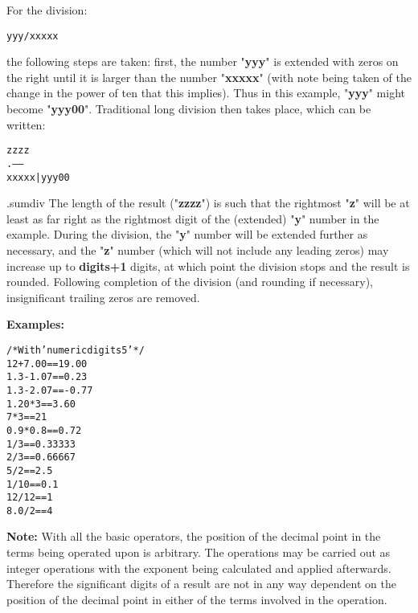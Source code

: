 \begin{description}
For the division:
\begin{alltt}
yyy / xxxxx
\end{alltt}
the following steps are taken: first, the number
"\textbf{yyy}" is extended
with zeros on the right until it is larger than
the number "\textbf{xxxxx}" (with note being taken of the change
in the power of ten that this implies).  Thus in this example,
"\textbf{yyy}"
might become
"\textbf{yyy00}".
Traditional long division then takes place, which can be written:
\begin{alltt}
         zzzz
      .------
xxxxx | yyy00
\end{alltt}
.sumdiv
The length of the result ("\textbf{zzzz}") is such that the
rightmost "\textbf{z}" will be at least as far right as the
rightmost digit of the (extended) "\textbf{y}" number in the
example.  During the division, the "\textbf{y}" number will be
extended further as necessary, and the "\textbf{z}" number
(which will not include any leading zeros) may increase up
to \textbf{digits+1} digits, at which point the division stops and the
result is rounded.
Following completion of the division (and rounding if necessary),
insignificant trailing zeros are removed.
\end{description}
 \textbf{Examples:}
\begin{alltt}
/* With 'numeric digits 5' */
12+7.00     ==  19.00
1.3-1.07    ==  0.23
1.3-2.07    ==  -0.77
1.20*3      ==  3.60
7*3         ==  21
0.9*0.8     ==  0.72
1/3         ==  0.33333
2/3         ==  0.66667
5/2         ==  2.5
1/10        ==  0.1
12/12       ==  1
8.0/2       ==  4
\end{alltt}
\textbf{Note: }With all the basic operators, the position of the decimal point
in the terms being operated upon is arbitrary.
The operations may be carried out as integer operations with the
exponent being calculated and applied afterwards.
Therefore the significant digits of a result are not in any way
dependent on the position of the decimal point in either of the terms
involved in the operation.
